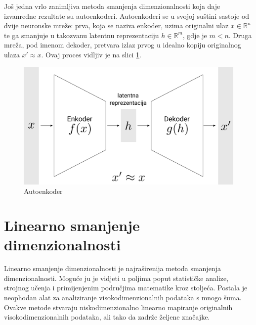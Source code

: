 \documentclass[times, utf8, diplomski]{fer}
\begin{document}
\medskip
Još jedna vrlo zanimljiva metoda smanjenja dimenzionalnosti koja daje izvanredne rezultate su autoenkoderi. Autoenkoderi se u svojoj suštini sastoje od dvije neuronske mreže: prva, koja se naziva enkoder, uzima originalni ulaz \(x \in \mathbb{R}^n\) te ga smanjuje u takozvanu latentnu reprezentaciju \(h \in \mathbb{R}^m\), gdje je \(m < n\). Druga mreža, pod imenom dekoder, pretvara izlaz prvog u idealno kopiju originalnog ulaza \(x' \approx x\). Ovaj proces vidljiv je na slici \ref{fig:autoencoder}.

\begin{figure}[htb]
    \centering
    \includegraphics[width=12cm]{resources/images/reduction/autoencoder.png}
    \caption{Autoenkoder}
    \label{fig:autoencoder}
\end{figure}

\section{Linearno smanjenje dimenzionalnosti}\label{sec:lin_reduc}

Linearno smanjenje dimenzionalnosti  je najraširenija metoda smanjenja dimenzionalnosti. Moguće ju je vidjeti u poljima poput statističke analize, strojnog učenja i primijenjenim područjima matematike kroz stoljeća. Postala je neophodan alat za analiziranje visokodimenzionalnih podataka s mnogo šuma. Ovakve metode stvaraju niskodimenzionalno linearno mapiranje originalnih visokodimenzionalnih podataka, ali tako da zadrže željene značajke.
\end{document}
